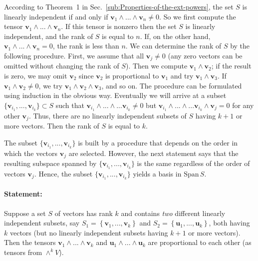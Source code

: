 According to Theorem~1 in Sec.~\ref{sub:Properties-of-the-ext-powers},
the set $S$ is linearly independent if and only if $\mathbf{v}_{1}\wedge...\wedge\mathbf{v}_{n}\neq0$.
So we first compute the tensor $\mathbf{v}_{1}\wedge...\wedge\mathbf{v}_{n}$.
If this tensor is nonzero then the set $S$ is linearly independent,
and the rank of $S$ is equal to $n$. If, on the other hand, $\mathbf{v}_{1}\wedge...\wedge\mathbf{v}_{n}=0$,
the rank is less than $n$. We can determine the rank of $S$ by the
following procedure. First, we assume that all $\mathbf{v}_{j}\neq0$
(any zero vectors can be omitted without changing the rank of $S$).
Then we compute $\mathbf{v}_{1}\wedge\mathbf{v}_{2}$; if the result
is zero, we may omit $\mathbf{v}_{2}$ since $\mathbf{v}_{2}$ is
proportional to $\mathbf{v}_{1}$ and try $\mathbf{v}_{1}\wedge\mathbf{v}_{3}$.
If $\mathbf{v}_{1}\wedge\mathbf{v}_{2}\neq0$, we try $\mathbf{v}_{1}\wedge\mathbf{v}_{2}\wedge\mathbf{v}_{3}$,
and so on. The procedure can be formulated using induction in the
obvious way. Eventually we will arrive at a subset $\{\mathbf{v}_{i_{1}},...,\mathbf{v}_{i_{k}}\}\subset S$
such that $\mathbf{v}_{i_{1}}\wedge...\wedge...\mathbf{v}_{i_{k}}\neq0$
but $\mathbf{v}_{i_{1}}\wedge...\wedge...\mathbf{v}_{i_{k}}\wedge\mathbf{v}_{j}=0$
for any other $\mathbf{v}_{j}$. Thus, there are no linearly independent
subsets of $S$ having $k+1$ or more vectors. Then the rank of $S$
is equal to $k$. 

The subset $\{\mathbf{v}_{i_{1}},...,\mathbf{v}_{i_{k}}\}$ is built
by a procedure that depends on the order in which the vectors $\mathbf{v}_{j}$
are selected. However, the next statement says that the resulting
subspace spanned by $\{\mathbf{v}_{i_{1}},...,\mathbf{v}_{i_{k}}\}$
is the same regardless of the order of vectors $\mathbf{v}_{j}$.
Hence, the subset $\{\mathbf{v}_{i_{1}},...,\mathbf{v}_{i_{k}}\}$
yields a basis in $\text{Span}\, S$. 


\paragraph{Statement: }

Suppose a set $S$ of vectors has rank $k$ and contains \emph{two}
different linearly independent subsets, say $S_{1}=\left\{ \mathbf{v}_{1},...,\mathbf{v}_{k}\right\} $
and $S_{2}=\left\{ \mathbf{u}_{1},...,\mathbf{u}_{k}\right\} $, both
having $k$ vectors (but no linearly independent subsets having $k+1$
or more vectors). Then the tensors $\mathbf{v}_{1}\wedge...\wedge\mathbf{v}_{k}$
and $\mathbf{u}_{1}\wedge...\wedge\mathbf{u}_{k}$ are proportional
to each other (as tensors from $\wedge^{k}V$).


